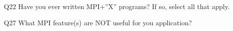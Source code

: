 \begin{description}%
\item{Q22} Have you ever written MPI+”X” programs? If so, select all that apply.%
\item{Q27} What MPI feature(s) are NOT useful for you application?%
\end{description}%
